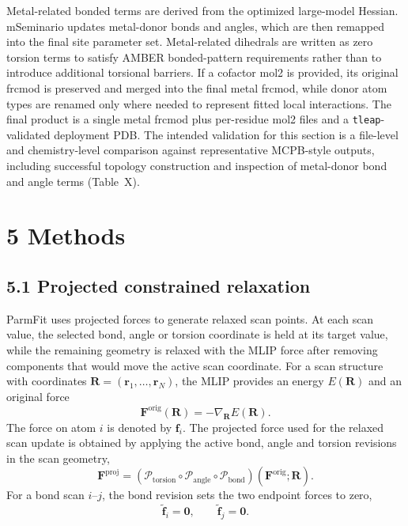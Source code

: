 Metal-related bonded terms are derived from the optimized large-model Hessian. mSeminario updates metal-donor bonds and angles, which are then remapped into the final site parameter set. Metal-related dihedrals are written as zero torsion terms to satisfy AMBER bonded-pattern requirements rather than to introduce additional torsional barriers. If a cofactor mol2 is provided, its original frcmod is preserved and merged into the final metal frcmod, while donor atom types are renamed only where needed to represent fitted local interactions. The final product is a single metal frcmod plus per-residue mol2 files and a \texttt{tleap}-validated deployment PDB. The intended validation for this section is a file-level and chemistry-level comparison against representative MCPB-style outputs, including successful topology construction and inspection of metal-donor bond and angle terms (Table~X).

\section{5 Methods}

\subsection{5.1 Projected constrained relaxation}

ParmFit uses projected forces to generate relaxed scan points. At each scan value, the selected bond, angle or torsion coordinate is held at its target value, while the remaining geometry is relaxed with the MLIP force after removing components that would move the active scan coordinate. For a scan structure with coordinates $\mathbf{R}=(\mathbf{r}_1,\ldots,\mathbf{r}_N)$, the MLIP provides an energy $E(\mathbf{R})$ and an original force
\begin{equation}
\mathbf{F}^{\mathrm{orig}}(\mathbf{R})=-\nabla_{\mathbf{R}}E(\mathbf{R}) .
\end{equation}
The force on atom $i$ is denoted by $\mathbf{f}_i$. The projected force used for the relaxed scan update is obtained by applying the active bond, angle and torsion revisions in the scan geometry,
\begin{equation}
\mathbf{F}^{\mathrm{proj}}
=
\left(
\mathcal{P}_{\mathrm{torsion}}
\circ
\mathcal{P}_{\mathrm{angle}}
\circ
\mathcal{P}_{\mathrm{bond}}
\right)
\left(\mathbf{F}^{\mathrm{orig}};\mathbf{R}\right).
\end{equation}
For a bond scan $i$--$j$, the bond revision sets the two endpoint forces to zero,
\begin{equation}
\widetilde{\mathbf{f}}_i=\mathbf{0},
\qquad
\widetilde{\mathbf{f}}_j=\mathbf{0}.
\end{equation}

